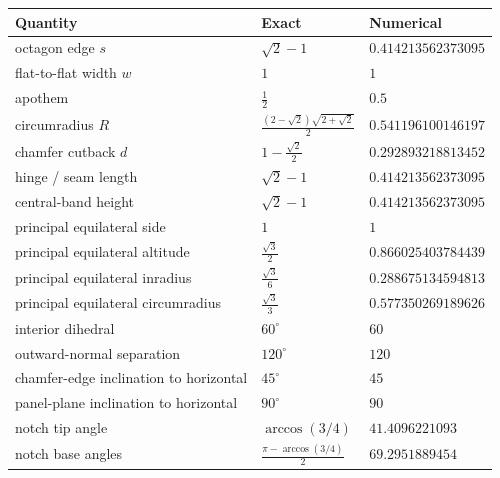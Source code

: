 \documentclass[
  11pt,
  a4paper,
]{article}
\newcounter{none} %
\begin{document}
{\def\LTcaptype{none} %
\begin{longtable}[]{@{}
  >{\raggedright\arraybackslash}p{}
  >{\raggedleft\arraybackslash}p{}
  >{\raggedleft\arraybackslash}p{}@{}}
\toprule\noalign{}
\begin{minipage}[b]{\linewidth}\raggedright
Quantity
\end{minipage} & \begin{minipage}[b]{\linewidth}\raggedleft
Exact
\end{minipage} & \begin{minipage}[b]{\linewidth}\raggedleft
Numerical
\end{minipage} \\
\midrule\noalign{}
\endhead
\bottomrule\noalign{}
\endlastfoot
octagon edge \(s\) & \(\sqrt2-1\) & \(0.414213562373095\) \\
flat-to-flat width \(w\) & \(1\) & \(1\) \\
apothem & \(\tfrac12\) & \(0.5\) \\
circumradius \(R\) & \(\tfrac{(2-\sqrt2)\sqrt{2+\sqrt2}}{2}\) & \(0.541196100146197\) \\
chamfer cutback \(d\) & \(1-\tfrac{\sqrt2}{2}\) & \(0.292893218813452\) \\
hinge / seam length & \(\sqrt2-1\) & \(0.414213562373095\) \\
central-band height & \(\sqrt2-1\) & \(0.414213562373095\) \\
principal equilateral side & \(1\) & \(1\) \\
principal equilateral altitude & \(\tfrac{\sqrt3}{2}\) & \(0.866025403784439\) \\
principal equilateral inradius & \(\tfrac{\sqrt3}{6}\) & \(0.288675134594813\) \\
principal equilateral circumradius & \(\tfrac{\sqrt3}{3}\) & \(0.577350269189626\) \\
interior dihedral & \(60^\circ\) & \(60\) \\
outward-normal separation & \(120^\circ\) & \(120\) \\
chamfer-edge inclination to horizontal & \(45^\circ\) & \(45\) \\
panel-plane inclination to horizontal & \(90^\circ\) & \(90\) \\
notch tip angle & \(\arccos(3/4)\) & \(41.4096221093\) \\
notch base angles & \(\tfrac{\pi-\arccos(3/4)}{2}\) & \(69.2951889454\) \\

\end{longtable}}
\end{document}

